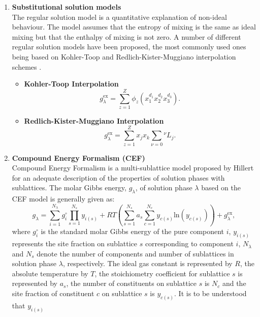 	\begin{enumerate}
	\item \textbf{Substitutional solution models}\\
	The regular solution model is a quantitative explanation of non-ideal behaviour. The model assumes that the entropy of mixing is the same as ideal mixing but that the enthalpy of mixing is not zero. A number of different regular solution models have been proposed, the most commonly used ones being based on Kohler-Toop and Redlich-Kister-Muggiano interpolation schemes \cite{Lukas07}.
		\begin{itemize}
			\item \textbf{Kohler-Toop Interpolation}
			\begin{equation}
				g_{\lambda}^\text{ex} = \sum_{z=1}^Z \phi_z (x_1^{d_1} x_2^{d_2} x_3^{d_3} ).
			\end{equation}
			\item \textbf{Redlich-Kister-Muggiano Interpolation}
			\begin{equation}
				g_{\lambda}^\text{ex} = \sum_{z=1}^Z x_j x_k \sum_{\nu = 0} {^\nu}L_{j}.
			\end{equation}
			\end{itemize}
	\item \textbf{Compound Energy Formalism (CEF)} \\
	Compound Energy Formalism is a multi-sublattice model proposed by Hillert \cite{Hillert01} for an adequate description of the properties of solution phases with sublattices. The molar Gibbs energy, $g_{\lambda}$, of solution phase $\lambda$ based on the CEF model is generally given as:
	\begin{equation}\label{eq:g_lambda}
	g_{\lambda} = \sum_{i=1}^{N_{\lambda}} g_{i}^{\circ} \prod _{s=1}^{N_s} y_{i(s)} + RT\left( \sum_{s=1}^{N_s} a_s \sum_{c=1}^{N_c}   y_{c(s)} \mathrm{ln} (y_{c(s)}) \right) + g_{\lambda}^\text{ex},
	\end{equation}
	where $g_{i}^{\circ}$ is the standard molar Gibbs energy of the pure component $i$,
$y_{i(s)}$ represents the site fraction on sublattice $s$ corresponding to component $i$, $N_{\lambda}$ and
$N_s$ denote the number of components and number of sublattices in solution phase $\lambda$, respectively.
The ideal gas constant is represented by $R$, the absolute temperature by $T$, the stoichiometry
coefficient for sublattice $s$ is represented by $a_s$, the number of constituents on sublattice $s$ is $N_c$
and the site fraction of constituent $c$ on sublattice $s$ is $y_{c(s)}$.  It is to be understood that $y_{i(s)}$

\end{enumerate}
